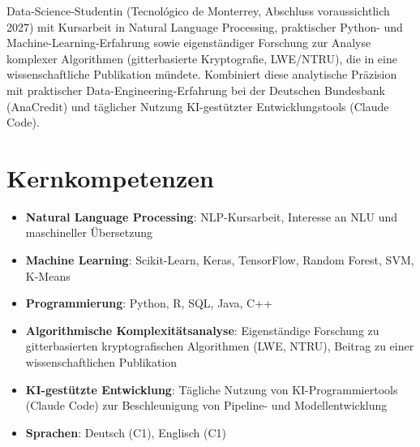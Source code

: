 \documentclass[11pt,a4paper,sans]{moderncv}
\begin{document}
\makecvtitle


\vspace{6pt}
\small{Data-Science-Studentin (Tecnológico de Monterrey, Abschluss voraussichtlich 2027) mit Kursarbeit in Natural Language Processing, praktischer Python- und Machine-Learning-Erfahrung sowie eigenständiger Forschung zur Analyse komplexer Algorithmen (gitterbasierte Kryptografie, LWE/NTRU), die in eine wissenschaftliche Publikation mündete. Kombiniert diese analytische Präzision mit praktischer Data-Engineering-Erfahrung bei der Deutschen Bundesbank (AnaCredit) und täglicher Nutzung KI-gestützter Entwicklungstools (Claude Code).}


\section{Kernkompetenzen}
\vspace{1pt}
\begin{itemize}

\item \textbf{Natural Language Processing}: NLP-Kursarbeit, Interesse an NLU und maschineller Übersetzung

\item \textbf{Machine Learning}: Scikit-Learn, Keras, TensorFlow, Random Forest, SVM, K-Means

\item \textbf{Programmierung}: Python, R, SQL, Java, C++

\item \textbf{Algorithmische Komplexitätsanalyse}: Eigenständige Forschung zu gitterbasierten kryptografischen Algorithmen (LWE, NTRU), Beitrag zu einer wissenschaftlichen Publikation

\item \textbf{KI-gestützte Entwicklung}: Tägliche Nutzung von KI-Programmiertools (Claude Code) zur Beschleunigung von Pipeline- und Modellentwicklung

\item \textbf{Sprachen}: Deutsch (C1), Englisch (C1)

\end{itemize}
\end{document}
